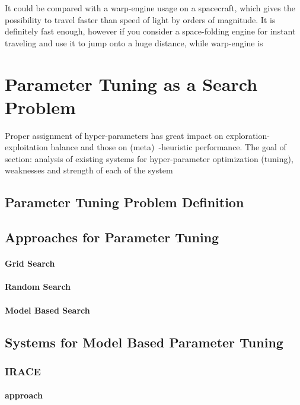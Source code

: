 It could be compared with a warp-engine usage on a spacecraft, which gives the possibility to travel faster than speed of light by orders of magnitude. It is definitely fast enough, however if you consider a space-folding engine for instant traveling and use it to jump onto a huge distance, while warp-engine is 


\section{Parameter Tuning as a Search Problem}\label{bg: parameter tuning}
Proper assignment of hyper-parameters has great impact on exploration-exploitation balance and those on (meta)~-heuristic performance. 
The goal of section: analysis of existing systems for hyper-parameter optimization (tuning), weaknesses and strength of each of the system

\subsection{Parameter Tuning Problem Definition}
\subsection{Approaches for Parameter Tuning}
\paragraph{Grid Search}
\paragraph{Random Search}
\paragraph{Model Based Search}

\subsection{Systems for Model Based Parameter Tuning}\label{bg: parameter tuning expamples}

\subsubsection{IRACE}
\paragraph{approach} \cite{irace:lopez2016irace}
